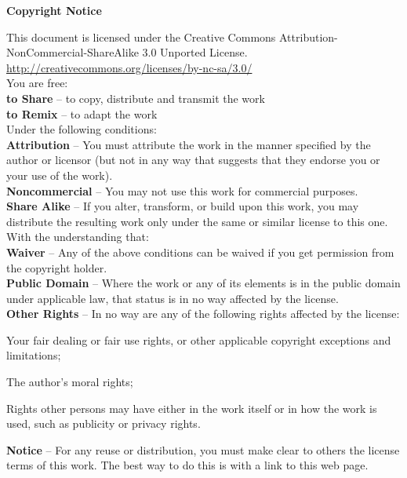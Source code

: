 \begin{center}
\large\textbf{Copyright Notice}
\end{center}

\noindent
This document is licensed under the Creative Commons Attribution-NonCommercial-ShareAlike 3.0 Unported License. \url{http://creativecommons.org/licenses/by-nc-sa/3.0/}
\\[0.3cm]
You are free:
\\
\textbf{to Share} -- to copy, distribute and transmit the work
\\
\textbf{to Remix} -- to adapt the work
\\[0.3cm]
Under the following conditions:
\\
\textbf{Attribution} -- You must attribute the work in the manner specified by the author or licensor (but not in any way that suggests that they endorse you or your use of the work).
\\
\textbf{Noncommercial} -- You may not use this work for commercial purposes.
\\
\textbf{Share Alike} -- If you alter, transform, or build upon this work, you may distribute the resulting work only under the same or similar license to this one.
\\[0.3cm]
With the understanding that:
\\
\textbf{Waiver} -- Any of the above conditions can be waived if you get permission from the copyright holder.
\\
\textbf{Public Domain} -- Where the work or any of its elements is in the public domain under applicable law, that status is in no way affected by the license.
\\
\textbf{Other Rights} -- In no way are any of the following rights affected by the license:
\begin{itemize*}
	\item Your fair dealing or fair use rights, or other applicable copyright exceptions and limitations;
	\item The author's moral rights;
	\item Rights other persons may have either in the work itself or in how the work is used, such as publicity or privacy rights.
\end{itemize*}
\textbf{Notice} -- For any reuse or distribution, you must make clear to others the license terms of this work. The best way to do this is with a link to this web page.